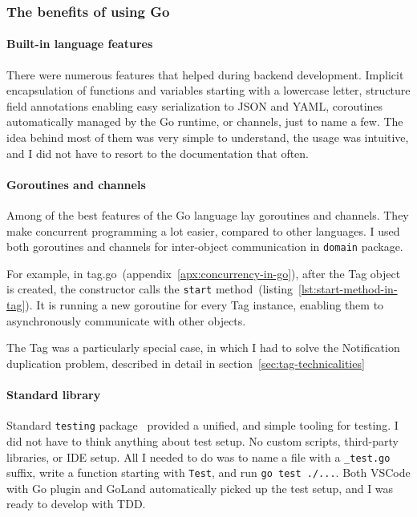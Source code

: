 \subsubsection{The benefits of using Go}\label{sec:the-benefits-of-using-go}

\paragraph*{Built-in language features}\label{sec:built-in-language-features}

There were numerous features
that helped during backend development.
Implicit encapsulation of functions and variables
starting with a lowercase letter,
structure field annotations
enabling easy serialization
to \ac{JSON} and \ac{YAML},
coroutines automatically managed by the Go runtime,
or channels,
just to name a few.
The idea behind most of them
was very simple to understand,
the usage was intuitive,
and I did not have to resort to the documentation that often.

\paragraph*{Goroutines and channels}\label{sec:goroutines-and-channels}

Among of the best features of the Go language lay goroutines and channels.
They make concurrent programming a lot easier, compared to other languages.
I used both goroutines and channels
for inter-object communication in \texttt{domain} package.

For example, in {tag.go}~(appendix~\ref{apx:concurrency-in-go}),
after the Tag object is created,
the constructor calls
the \texttt{start} method~(listing~\ref{lst:start-method-in-tag}).
It is running a new goroutine for every Tag instance,
enabling them to asynchronously communicate with other objects.

The Tag was a particularly special case,
in which I had to solve
the Notification duplication problem,
described in detail in section~\ref{sec:tag-technicalities}

\paragraph*{Standard library}\label{sec:standard-library}

Standard \texttt{testing} package~\cite{cox_testing_2022} provided
a unified, and simple tooling for testing.
I did not have to think anything about test setup.
No custom scripts, third-party libraries, or \ac{IDE} setup.
All I needed to do was to name a file with a \texttt{\_test.go} suffix,
write a function starting with \texttt{Test},
and run \texttt{go\ test\ ./...}.
Both \ac{VSCode} with Go plugin and GoLand
automatically picked up the test setup,
and I was ready to develop with \ac{TDD}.

